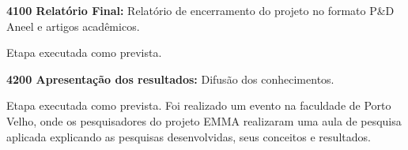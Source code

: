 \textbf{4100 Relatório Final:} Relatório de encerramento do projeto no formato
P\&D Aneel e artigos acadêmicos.

Etapa executada como prevista. 

\textbf{4200 Apresentação dos resultados:} Difusão dos conhecimentos.

Etapa executada como prevista. Foi realizado um evento na faculdade de Porto
Velho, onde os pesquisadores do projeto EMMA realizaram uma aula de pesquisa
aplicada explicando as pesquisas desenvolvidas, seus conceitos e resultados.
 